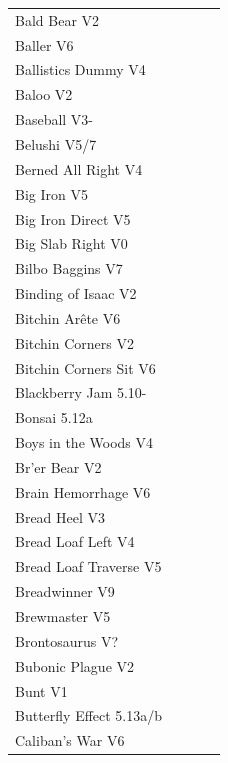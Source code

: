 \begin{flushleft}
\begin{center}
\begin{supertabular}{p{0.76\linewidth}p{0.08\linewidth}}
Bald Bear V2 & \pageref{rt:Bald Bear} \\
Baller V6 & \pageref{vr:Baller} \\
Ballistics Dummy V4 & \pageref{rt:Ballistics Dummy} \\
Baloo V2 & \pageref{rt:Baloo} \\
Baseball V3- & \pageref{rt:Baseball} \\
Belushi V5/7 & \pageref{rt:Belushi} \\
Berned All Right V4 & \pageref{rt:Berned All Right} \\
Big Iron V5 & \pageref{rt:Big Iron} \\
Big Iron Direct V5 & \pageref{vr:Big Iron Direct} \\
Big Slab Right V0 & \pageref{rt:Big Slab Right} \\
Bilbo Baggins V7 & \pageref{vr:Bilbo Baggins} \\
Binding of Isaac V2 & \pageref{rt:Binding of Isaac} \\
Bitchin Arête V6 & \pageref{rt:Bitchin Arête} \\
Bitchin Corners V2 & \pageref{rt:Bitchin Corners} \\
Bitchin Corners Sit V6 & \pageref{vr:Bitchin Corners Sit} \\
Blackberry Jam 5.10- & \pageref{rt:Blackberry Jam} \\
Bonsai 5.12a & \pageref{rt:Bonsai} \\
Boys in the Woods V4 & \pageref{rt:Boys in the Woods} \\
Br'er Bear V2 & \pageref{rt:Br'er Bear} \\
Brain Hemorrhage V6 & \pageref{rt:Brain Hemorrhage} \\
Bread Heel V3 & \pageref{rt:Bread Heel} \\
Bread Loaf Left V4 & \pageref{rt:Bread Loaf Left} \\
Bread Loaf Traverse V5 & \pageref{rt:Bread Loaf Traverse} \\
Breadwinner V9 & \pageref{rt:Breadwinner} \\
Brewmaster V5 & \pageref{rt:Brewmaster} \\
Brontosaurus V? & \pageref{rt:Brontosaurus} \\
Bubonic Plague V2 & \pageref{rt:Bubonic Plague} \\
Bunt V1 & \pageref{rt:Bunt} \\
Butterfly Effect 5.13a/b & \pageref{rt:Butterfly Effect} \\
Caliban's War V6 & \pageref{rt:Caliban's War} \\

\end{supertabular}
\end{center}
\end{flushleft}
